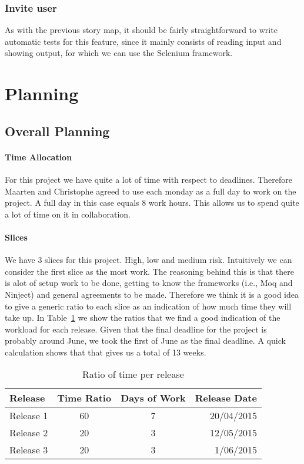 \documentclass[10pt,a4paper,BCOR12mm, headexclude, footexclude,
  twoside, openright]{scrartcl}
\numberwithin{equation}{section} %
\numberwithin{figure}{section} %
\numberwithin{table}{section} %
\begin{document}
\subsubsection*{Invite user}
As with the previous story map, it should be fairly straightforward to write
automatic tests for this feature, since it mainly consists of reading input and
showing output, for which we can use the Selenium framework.


\newpage
\section{Planning}
\subsection{Overall Planning}
\paragraph{Time Allocation}
For this project we have quite a lot of time with respect to
deadlines. Therefore Maarten and Christophe agreed to use each monday as a full
day to work on the project. A full day in this case equals 8 work hours. This
allows us to spend quite a lot of time on it in collaboration.

\paragraph{Slices}
We have 3 slices for this project. High, low and medium risk. Intuitively we can
consider the first slice as the most work. The reasoning behind this is that
there is alot of setup work to be done, getting to know the frameworks (i.e.,
Moq and Ninject) and general agreements to be made. Therefore we think it is a
good idea to give a generic ratio to each slice as an indication of how much
time they will take up. In Table~\ref{tbl:ratios} we show the ratios that we
find a good indication of the workload for each release. Given that the final
deadline for the project is probably around June, we took the first of June as
the final deadline. A quick calculation shows that that gives us a total of 13
weeks.
\begin{table}[h]
  \centering
  \label{tbl:ratios}
  \caption{Ratio of time per release}
  \begin{tabular}{| l| c| c| r | }
    \hline
    Release   & Time Ratio & Days of Work & Release Date \\
    \hline
    Release 1 & 60         & 7            & 20/04/2015 \\         
    Release 2 & 20         & 3            & 12/05/2015 \\
    Release 3 & 20         & 3            & 1/06/2015 \\
    \hline
  \end{tabular}
\end{table}
\end{document}
